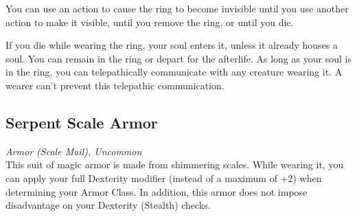 \documentclass[letterpaper,openany,oneside,twocolumn]{book}
\begin{document}
You can use an action to cause the ring to become invisible until you use another action to make it visible, until you remove the ring, or until you die.

If you die while wearing the ring, your soul enters it, unless it already houses a soul. You can remain in the ring or depart for the afterlife. As long as your soul is in the ring, you can telepathically communicate with any creature wearing it. A wearer can't prevent this telepathic communication.

\subsection*{Serpent Scale Armor}
\textit{Armor (Scale Mail), Uncommon}\\
This suit of magic armor is made from shimmering scales. While wearing it, you can apply your full Dexterity modifier (instead of a maximum of +2) when determining your Armor Class. In addition, this armor does not impose disadvantage on your Dexterity (Stealth) checks.
\end{document}
